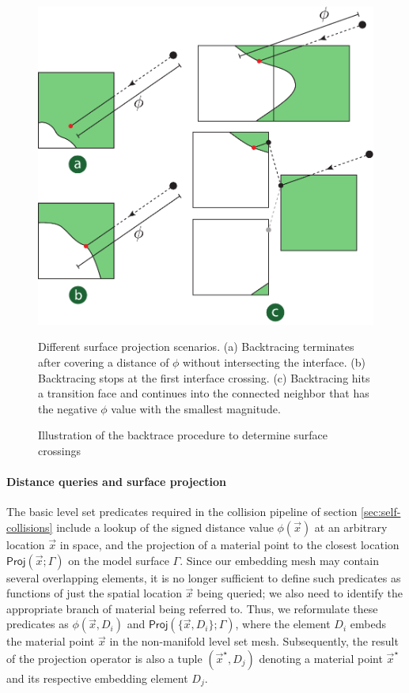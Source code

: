 \begin{figure}

\centering
\includegraphics[width=.88\columnwidth]{chapter_nonmanifoldlevelsets/images/backtrace-cases-alternative-4.pdf}

\caption{Illustration of the backtrace procedure to determine surface crossings}{Different surface projection scenarios. (a) Backtracing terminates after covering a distance of $\phi$ without intersecting the interface. (b) Backtracing stops at the
  first interface crossing. (c) Backtracing hits a transition
  face and continues into the connected neighbor that has the negative $\phi$
  value with the smallest magnitude.}
\label{fig:backtrace}
\end{figure}




\paragraph{Distance queries and surface projection} The basic level
set predicates required in the collision pipeline of section
\ref{sec:self-collisions} include a lookup of the signed distance
value $\phi(\vec{x})$ at an arbitrary location $\vec{x}$ in space, and
the projection of a material point to the closest location
$\textsf{Proj}(\vec{x};\Gamma)$ on the model surface $\Gamma$. Since
our embedding mesh may contain several overlapping elements, it is no
longer sufficient to define such predicates as functions of just the
spatial location $\vec{x}$ being queried; we also need to identify the
appropriate branch of material being referred to. Thus, we reformulate
these predicates as $\phi(\vec{x},D_i)$ and
$\textsf{Proj}(\{\vec{x},D_i\};\Gamma)$, where the element $D_i$
embeds the material point $\vec{x}$ in the non-manifold level set
mesh. Subsequently, the result of the projection operator is also a
tuple $(\vec{x}^\star,D_j)$ denoting a material point $\vec{x}^\star$
and its respective embedding element $D_j$.


